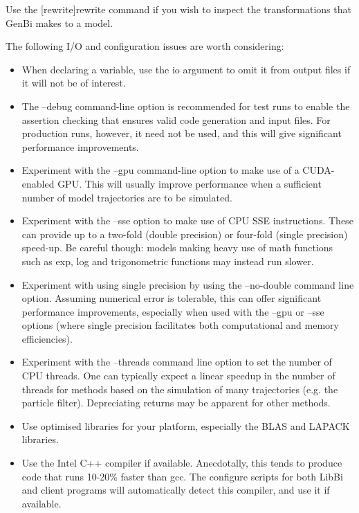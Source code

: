 Use the \hyperref[hyper][rewrite]{\sf rewrite} command if you
wish to inspect the transformations that GenBi makes to a model.

The following I/O and configuration issues are worth considering:
\begin{itemize}
\item When declaring a variable, use the \textsf{io} argument to omit it from
  output files if it will not be of interest.

\item The \textsf{--debug} command-line option is recommended for test runs to
  enable the assertion checking that ensures valid
  code generation and input files. For production runs, however, it need not
  be used, and this will give significant performance improvements.

\item Experiment with the \textsf{--gpu} command-line option to make use of a
  CUDA-enabled GPU. This will usually improve performance when a
  sufficient number of model trajectories are to be simulated.

\item Experiment with the \textsf{--sse} option to make use of CPU SSE
  instructions. These can provide up to a two-fold
  (double precision) or four-fold (single precision) speed-up. Be careful
  though: models making heavy use of math functions such as \textsf{exp},
  \textsf{log} and trigonometric functions may instead run slower.

\item Experiment with using single precision by using
  the \textsf{--no-double} command line option. Assuming numerical error is
  tolerable, this can offer significant performance improvements, especially
  when used with the \textsf{--gpu} or \textsf{--sse} options (where single
  precision facilitates both computational and memory efficiencies).

\item {}Experiment with the \textsf{--threads} command
  line option to set the number of CPU threads. One can typically expect a
  linear speedup in the number of threads for methods based on the simulation
  of many trajectories (e.g. the particle filter). Depreciating returns may be
  apparent for other methods.

\item Use optimised libraries for your platform, especially the
  BLAS and LAPACK libraries.

\item Use the Intel C++ compiler if
  available. Anecdotally, this tends to produce code that runs 10-20\% faster
  than \textsf{gcc}. The \textsf{configure} scripts for both LibBi
  and client programs will automatically detect this compiler,
  and use it if available.

\end{itemize}

